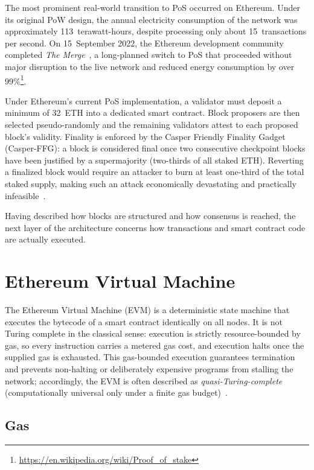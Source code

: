 The most prominent real-world transition to PoS occurred on Ethereum. Under its original PoW design, the annual electricity consumption of the network was approximately 113~terawatt-hours, despite processing only about 15~transactions per second. On 15~September 2022, the Ethereum development community completed \emph{The Merge}~\cite{mit_merge}, a long-planned switch to PoS that proceeded without major disruption to the live network and reduced energy consumption by over 99\%\footnote{\url{https://en.wikipedia.org/wiki/Proof_of_stake}}.

Under Ethereum's current PoS implementation, a validator must deposit a minimum of 32~ETH into a dedicated smart contract. Block proposers are then selected pseudo-randomly and the remaining validators attest to each proposed block's validity. Finality is enforced by the Casper Friendly Finality Gadget (Casper-FFG): a block is considered final once two consecutive checkpoint blocks have been justified by a supermajority (two-thirds of all staked ETH). Reverting a finalized block would require an attacker to burn at least one-third of the total staked supply, making such an attack economically devastating and practically infeasible~\cite{ethereum_pos, buterin2019casperfriendlyfinalitygadget}.

Having described how blocks are structured and how consensus is reached, the next layer of the architecture concerns how transactions and smart contract code are actually executed.

\section{Ethereum Virtual Machine}
\label{sec:evm}

The Ethereum Virtual Machine (EVM) is a deterministic state machine that executes the bytecode of a smart contract identically on all nodes. It is not Turing complete in the classical sense: execution is strictly resource-bounded by gas, so every instruction carries a metered gas cost, and execution halts once the supplied gas is exhausted. This gas-bounded execution guarantees termination and prevents non-halting or deliberately expensive programs from stalling the network; accordingly, the EVM is often described as \emph{quasi-Turing-complete} (computationally universal only under a finite gas budget)~\cite{wood2014yellow, antonopoulos2018mastering}.

\subsection{Gas}
\label{subsec:gas}

